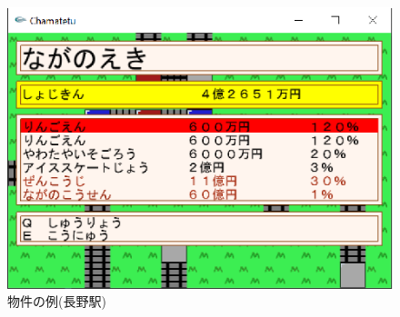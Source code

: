 \documentclass[a4j]{jarticle}
\begin{document}
      \begin{figure}[H]
        \centering
        \includegraphics[scale=1.5]{bukkenex.eps}
        \caption{物件の例(長野駅)}
         \label{bukkenex}
        \end{figure}
    
\end{document}
